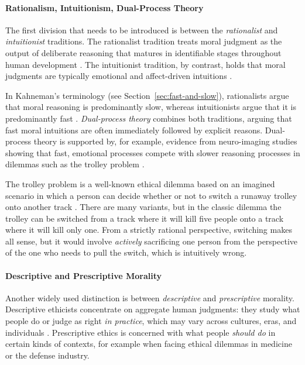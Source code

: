 \paragraph{Rationalism, Intuitionism, Dual-Process Theory} The first division that needs to be introduced is between the \emph{rationalist} and \emph{intuitionist} traditions. The rationalist tradition treats moral judgment as the output of deliberate reasoning that matures in identifiable stages throughout human development \citep[e.g.][]{kohlberg1969stage}. The intuitionist tradition, by contrast, holds that moral judgments are typically emotional and affect-driven intuitions \citep{haidt2001emotional}. 

In Kahneman's terminology (see Section~\ref{sec:fast-and-slow}), rationalists argue that moral reasoning is predominantly slow, whereas intuitionists argue that it is predominantly fast \citep{kahneman2011thinking}. \emph{Dual-process theory} combines both traditions, arguing that fast moral intuitions are often immediately followed by explicit reasons. Dual-process theory is supported by, for example, evidence from neuro-imaging studies showing that fast, emotional processes compete with slower reasoning processes in dilemmas such as the trolley problem \citep{greene2001fmri}.

The trolley problem is a well-known ethical dilemma based on an imagined scenario in which a person can decide whether or not to switch a runaway trolley onto another track \citep{thomson1985trolley}. There are many variants, but in the classic dilemma the trolley can be switched from a track where it will kill five people onto a track where it will kill only one. From a strictly rational perspective, switching makes all sense, but it would involve \emph{actively} sacrificing one person from the perspective of the one who needs to pull the switch, which is intuitively wrong.

\paragraph{Descriptive and Prescriptive Morality} Another widely used distinction is between \emph{descriptive} and \emph{prescriptive} morality. Descriptive ethicists concentrate on aggregate human judgments: they study what people do or judge as right \emph{in practice}, which may vary across cultures, eras, and individuals \citep{hamalainen2016descriptive}. Prescriptive ethics is concerned with what people \emph{should do} in certain kinds of contexts, for example when facing ethical dilemmas in medicine or the defense industry. 

